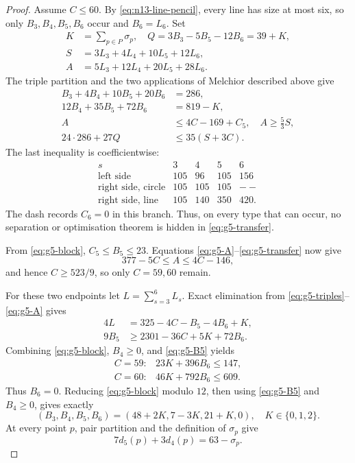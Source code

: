 \begin{proof}
Assume $C\leq60$.  By \eqref{eq:n13-line-pencil}, every line has size at
most six, so only $B_3,B_4,B_5,B_6$ occur and $B_6=L_6$.  Set
\begin{align*}
 K&=\sum_{p\in P}\sigma_p,\quad
 Q=3B_3-5B_5-12B_6=39+K,\\
 S&=3L_3+4L_4+10L_5+12L_6,\\
 A&=5L_3+12L_4+20L_5+28L_6.
\end{align*}
The triple partition and the two applications of Melchior described above
give
\begin{align}
 B_3+4B_4+10B_5+20B_6&=286,                       \label{eq:g5-triples}\\
 12B_4+35B_5+72B_6&=819-K,                         \label{eq:g5-block}\\
 A&\leq4C-169+C_5,\quad A\geq\frac53S,             \label{eq:g5-A}\\
 24\cdot286+27Q&\leq35(S+3C).                     \label{eq:g5-transfer}
\end{align}
The last inequality is coefficientwise:
\[
\begin{array}{c|rrrr}
s&3&4&5&6\\ \hline
\text{left side}&105&96&105&156\\
\text{right side, circle}&105&105&105&--\\
\text{right side, line}&105&140&350&420.
\end{array}
\]
The dash records $C_6=0$ in this branch.  Thus, on every type that can
occur, no separation or optimisation theorem is hidden in
\eqref{eq:g5-transfer}.

From \eqref{eq:g5-block}, $C_5\leq B_5\leq23$.  Equations
\eqref{eq:g5-A}--\eqref{eq:g5-transfer} now give
\[
 377-5C\leq A\leq4C-146,
\]
and hence $C\geq523/9$, so only $C=59,60$ remain.

For these two endpoints let $L=\sum_{s=3}^6L_s$.  Exact elimination from
\eqref{eq:g5-triples}--\eqref{eq:g5-A} gives
\begin{align}
 4L&=325-4C-B_5-4B_6+K,                            \label{eq:g5-L}\\
 9B_5&\geq2301-36C+5K+72B_6.                      \label{eq:g5-B5}
\end{align}
Combining \eqref{eq:g5-block}, $B_4\geq0$, and \eqref{eq:g5-B5} yields
\[
 \begin{array}{ll}
 C=59:&23K+396B_6\leq147,\\
 C=60:&46K+792B_6\leq609.
 \end{array}
\]
Thus $B_6=0$.  Reducing \eqref{eq:g5-block} modulo $12$, then using
\eqref{eq:g5-B5} and $B_4\geq0$, gives exactly
\begin{equation}
 (B_3,B_4,B_5,B_6)=(48+2K, 7-3K, 21+K, 0),
 \quad K\in\{0,1,2\}.                              \label{eq:g5-three-endpoints}
\end{equation}
At every point $p$, pair partition and the definition of $\sigma_p$ give
\begin{equation}
 7d_5(p)+3d_4(p)=63-\sigma_p.                      \label{eq:g5-point}
\end{equation}


\end{proof}
